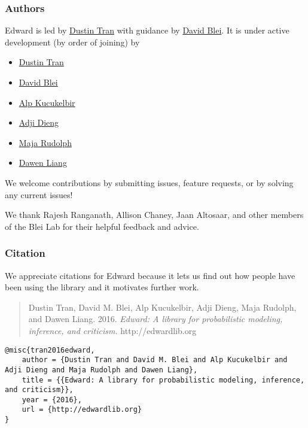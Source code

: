 \subsubsection{Authors}

Edward is led by \href{http://dustintran.com}{Dustin Tran} with guidance
by \href{http://www.cs.columbia.edu/~blei/}{David Blei}. It is under
active development (by order of joining) by
\begin{itemize}
  \item \href{http://dustintran.com}{Dustin Tran} 
  \item \href{http://www.cs.columbia.edu/~blei/}{David Blei} 
  \item \href{http://www.proditus.com/}{Alp Kucukelbir} 
  \item \href{http://stat.columbia.edu/~diengadji/}{Adji Dieng} 
  \item \href{http://maja-rita-rudolph.com/}{Maja Rudolph}
  \item \href{http://www.ee.columbia.edu/~dliang/}{Dawen Liang}
\end{itemize}
We welcome contributions by submitting issues, feature requests, or by solving
any current issues!

We thank Rajesh Ranganath, Allison Chaney, Jaan Altosaar, and other
members of the Blei Lab for their helpful feedback and advice.

\subsubsection{Citation}

We appreciate citations for Edward because it lets us find out how
people have been using the library and it motivates further work.

\begin{quote}
Dustin Tran, David M. Blei, Alp Kucukelbir, Adji Dieng, Maja Rudolph,
and Dawen Liang. 2016. 
\emph{Edward: A library for probabilistic modeling, inference, and criticism. }
http://edwardlib.org
\end{quote}

\begin{lstlisting}[class=JSON]
@misc{tran2016edward,
    author = {Dustin Tran and David M. Blei and Alp Kucukelbir and Adji Dieng and Maja Rudolph and Dawen Liang},
    title = {{Edward: A library for probabilistic modeling, inference, and criticism}},
    year = {2016},
    url = {http://edwardlib.org}
}
\end{lstlisting}



